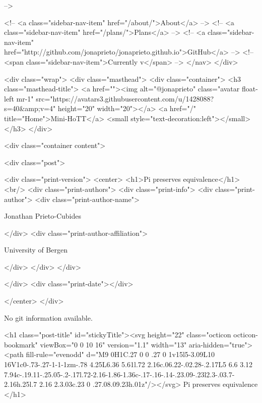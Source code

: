       
     -->

    <!-- <a class="sidebar-nav-item" href="/about/">About</a> -->
    <!-- <a class="sidebar-nav-item" href="/plans/">Plans</a> -->
    <!-- <a class="sidebar-nav-item" href="http://github.com/jonaprieto/jonaprieto.github.io">GitHub</a> -->
    <!-- <span class="sidebar-nav-item">Currently v</span> -->
  </nav>
</div>

    <div class="wrap">
      <div class="masthead">
        <div class="container">
          <h3 class="masthead-title">
            <a href=""><img alt="@jonaprieto" class="avatar float-left mr-1" src="https://avatars3.githubusercontent.com/u/1428088?s=40&amp;v=4" height="20" width="20"></a>
            <a href="/" title="Home">Mini-HoTT</a>
            <small style="text-decoration:left"></small>
          </h3>
        </div>
      
      <div class="container content">
        







<div class="post">

  <div class="print-version">
    <center>
      <h1>Pi preserves equivalence</h1><br/>
        <div class="print-authors">
          <div class="print-info">
            <div class="print-author">
              <div class="print-author-name">
                
                  Jonathan Prieto-Cubides
                
              </div>
              <div class="print-author-affiliation">
                
                  University of Bergen
                
                </div>
            </div>
          </div>
          
          
        </div>
        <div class="print-date"></div>
        
        
    </center>
  </div>

  
  No git information available.
  
  <h1 class="post-title" id="stickyTitle"><svg height="22" class="octicon octicon-bookmark" viewBox="0 0 10 16" version="1.1" width="13" aria-hidden="true"><path fill-rule="evenodd" d="M9 0H1C.27 0 0 .27 0 1v15l5-3.09L10 16V1c0-.73-.27-1-1-1zm-.78 4.25L6.36 5.61l.72 2.16c.06.22-.02.28-.2.17L5 6.6 3.12 7.94c-.19.11-.25.05-.2-.17l.72-2.16-1.86-1.36c-.17-.16-.14-.23.09-.23l2.3-.03.7-2.16h.25l.7 2.16 2.3.03c.23 0 .27.08.09.23h.01z"/></svg> Pi preserves equivalence
  </h1>

